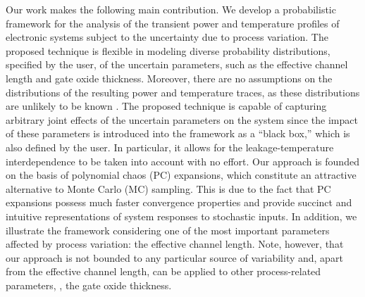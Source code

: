 
Our work makes the following main contribution.
We develop a probabilistic framework for the analysis of the transient power and temperature profiles of electronic systems subject to the uncertainty due to process variation.
The proposed technique is flexible in modeling diverse probability distributions, specified by the user, of the uncertain parameters, such as the effective channel length and gate oxide thickness.
Moreover, there are no assumptions on the distributions of the resulting power and temperature traces, as these distributions are unlikely to be known \apriori.
The proposed technique is capable of capturing arbitrary joint effects of the uncertain parameters on the system since the impact of these parameters is introduced into the framework as a ``black box,'' which is also defined by the user.
In particular, it allows for the leakage-temperature interdependence to be taken into account with no effort.
Our approach is founded on the basis of polynomial chaos (PC) expansions, which constitute an attractive alternative to Monte Carlo (MC) sampling.
This is due to the fact that PC expansions possess much faster convergence properties and provide succinct and intuitive representations of system responses to stochastic inputs.
In addition, we illustrate the framework considering one of the most important parameters affected by process variation: the effective channel length.
Note, however, that our approach is not bounded to any particular source of variability and, apart from the effective channel length, can be applied to other process-related parameters, \eg, the gate oxide thickness.
